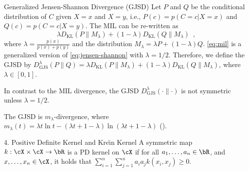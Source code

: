 \documentclass[final]{beamer}
\newcommand{\kr}{Kre\u{\i}n\xspace}
\newcommand{\kl}[2]{D_{\mathrm{KL}}( #1 \parallel #2 )}
\newcommand{\js}[2]{D_{\mathrm{JS}}( #1 \parallel #2 )}
\newcommand{\wjs}[3]{D_{\mathrm{GJS}}^{#1}( #2 \parallel #3 )}
\newlength{\onecolwid}
\begin{document}
\begin{frame}[t]
\begin{columns}[t]
\begin{column}{\onecolwid}
\begin{block}{Generalized Jensen-Shannon Divergence (GJSD)}
	 Let $P$ 
	and 
	$Q$ be the conditional distribution of $C$ given $X=x$ and $X=y$, 
	i.e., $ P(c) = p(C=c| X=x) $ and $ Q(c)=p(C=c| X=y) $. The MIL can be 
	re-written as
	\begin{equation}\label{eq:mil}
	\lambda \kl{P}{M_\lambda} + (1-\lambda) \kl{Q}{M_\lambda}\enspace,
	\end{equation}
	where  $\lambda=\frac{p(x)}{p(x)+p(y)}$ and the distribution $ 
	M_\lambda=\lambda P + (1-\lambda)Q $.
	\eqref{eq:mil} is a generalized version of 
	\eqref{eq:jensen-shannon} with $ \lambda=1/2 $. 
	Therefore, we define the 
	GJSD
	by
	$
	\wjs{\lambda}{P}{Q} = \lambda \kl{P}{M_\lambda} + (1-\lambda) 
	\kl{Q}{M_\lambda}$,
	where $ \lambda\in [0,1] $.

	
	 In 
	contrast to the MIL 
	divergence, the GJSD $ \wjs{\lambda}{\cdot}{\cdot} $ is not symmetric 
	unless 
	$ \lambda=1/2 $.

The GJSD is  $ m_\lambda $-divergence, where $	
m_\lambda(t) = \lambda t \ln t - (\lambda t + 1 - 
\lambda)\ln(\lambda t+1-\lambda)$ ().
\end{block}	
\vspace{3pt}

\begin{block}{4. Positive Definite Kernel and \kr Kernel}
		 A symmetric
		  map $ 
		k:\cX\times\cX\to \bR $ is a PD kernel on $ \cX $ if for 
		all 
		  $ a_1,\dots,a_n\in \bR $, and $ 
		x,\dots,x_n\in \cX $, it holds that $
		\sum_{i=1}^n \sum_{j=1}^n a_i a_j k(x_i,x_j) \ge 0$.
	
	

\end{block}
\end{column}
\end{columns}
\end{frame}
\end{document}
